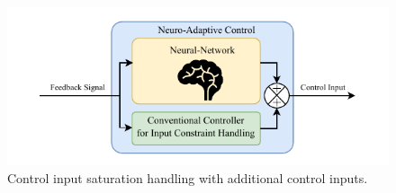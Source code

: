 \documentclass[8pt, aspectratio=169]{beamer}
\begin{document}
\begin{frame}{\insertsubsectionhead}
\begin{columns}[T]
        {
          \centering
          \begin{figure}
            \includegraphics[width=0.999\textwidth]{figures/existing_conv.drawio.pdf}
            \caption{Control input saturation handling with additional control inputs.}
          \end{figure}
        }

    \end{columns}

\end{frame}
\end{document}
